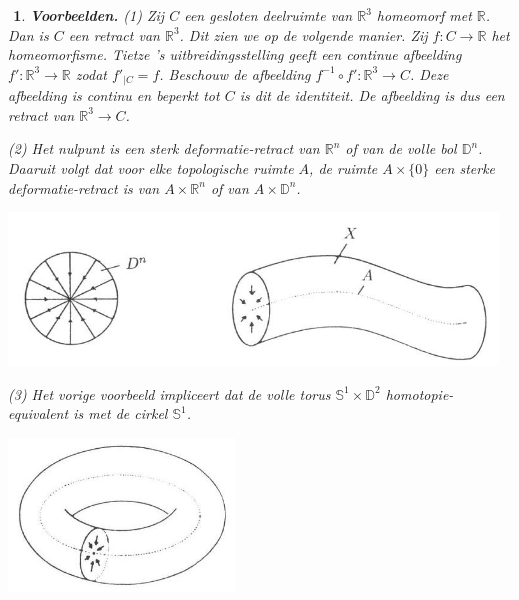 \documentclass[12pt]{book}
\newcommand{\R}{\mathbb{R}}
\newtheorem{vbnh}[stelh]{$\!\!$}
\newenvironment{vbn}{\begin{vbnh} \em {\bf Voorbeelden.}}{\end{vbnh}}
\begin{document}
\begin{vbn}
(1) Zij $C$ een gesloten deelruimte van $\R^3$ homeomorf met $\R$. Dan is $C$ een retract van $\R^3$. Dit zien we op de volgende manier. Zij $f:C\to \R$ het homeomorfisme. Tietze 's uitbreidingsstelling geeft een continue afbeelding $f':\R^3\to \R$ zodat $f'_{|C}=f$. Beschouw de afbeelding
$f^{-1}\circ f':\R^3\to C$. Deze afbeelding is continu en beperkt tot $C$ is dit de identiteit. De afbeelding is dus een retract van $\R^3\to C$. 

\bigskip
(2) Het nulpunt is een sterk deformatie-retract van $\R^n$ of van de volle bol $\mathbb{D}^n$. Daaruit volgt dat voor elke topologische ruimte $A$, de ruimte $A\times \{0\}$
een sterke deformatie-retract is van $A\times \R^n$ of van $A\times \mathbb{D}^{n}$.

\begin{center}
\includegraphics[width=13cm]{images/diskstr.JPG}
\end{center}



(3) Het vorige voorbeeld impliceert dat de volle torus $\mathbb{S}^{1}\times \mathbb{D}^{2}$ homotopie-equivalent is met de cirkel $\mathbb{S}^{1}$.

\begin{center}
\includegraphics[width=6cm]{images/voltorus.JPG}
\end{center}



\end{vbn}
\end{document}
